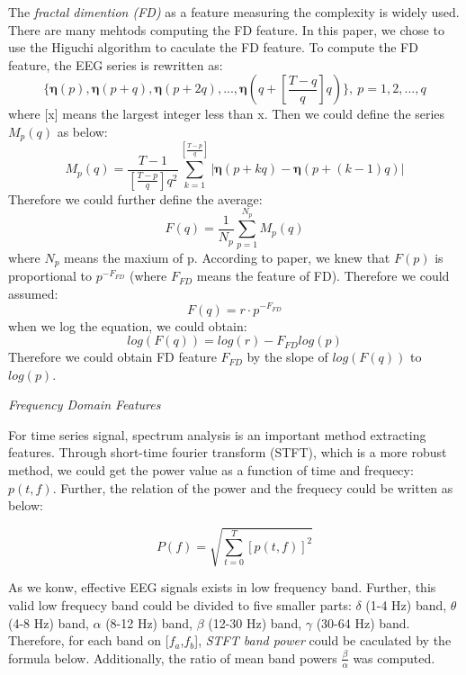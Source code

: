 \documentclass[runningheads,a4paper]{llncs}
\begin{document}
The \emph{fractal dimention (FD)} as a feature measuring the complexity is widely used.
There are many mehtods computing the FD feature. In this paper, we chose to use
the Higuchi algorithm\cite{FD} to caculate the FD feature. To compute the FD
feature, the EEG series is rewritten as:
\begin{equation}
    \{{\bm{\eta}}(p), {\bm{\eta}}(p+q), {\bm{\eta}}(p+2q), ... , {\bm{\eta}}(q+[\frac{T-q}{q}]q)\},\ p = 1,2,...,q
\end{equation}
where [x] means the largest integer less than x. Then we could define the series $M_p(q)$ as below:
\begin{equation}
  M_p(q) = \frac{T-1}{[\frac{T-p}{q}]q^2}\sum_{k=1}^{[\frac{T-p}{q}]}|{\bm{\eta}}(p+kq) - {\bm{\eta}}(p+(k-1)q)|
\end{equation}
 Therefore we could further define the average:
\begin{equation}
  F(q) = \frac{1}{N_p}\sum_{p=1}^{N_p}M_p(q)
\end{equation}
where $N_p$ means the maxium of p.
According to paper\cite{FD}, we knew that $F(p)$ is proportional to $p^{-F_{FD}}$
(where $F_{FD}$ means the feature of FD). Therefore we could assumed:
\begin{equation}
   F(q) = r\cdot{p^{-F_{FD}}}
\end{equation}
when we log the equation, we could obtain:
\begin{equation}
  log(F(q)) = log(r) - {F_{FD}}log(p)
\end{equation}
Therefore we could obtain FD feature $F_{FD}$ by the slope of $log(F(q))$ to $log(p)$.

\emph{Frequency Domain Features}

For time series signal, spectrum analysis is an important method extracting features.
Through short-time fourier transform (STFT)\cite{STFT}, which is a more robust method,
we could get the power value as a function of time and frequecy: $p(t,f)$. Further,
the relation of the power and the frequecy could be written as below:

\begin{equation}
    P(f) = \sqrt{\sum_{t=0}^{T}[p(t,f)]^2}
\end{equation}

As we konw, effective EEG signals exists in low frequency band.
Further, this valid low frequecy band could be divided to five smaller parts:
$\delta$ (1-4 Hz) band, $\theta$ (4-8 Hz) band, $\alpha$ (8-12 Hz) band,
$\beta$ (12-30 Hz) band, $\gamma$ (30-64 Hz) band.
Therefore, for each band on [$f_a$,$f_b$],
\emph{STFT band power} could be caculated by the formula below. Additionally,
the ratio of mean band powers $\frac{\beta}{\alpha}$ was computed.
\end{document}
